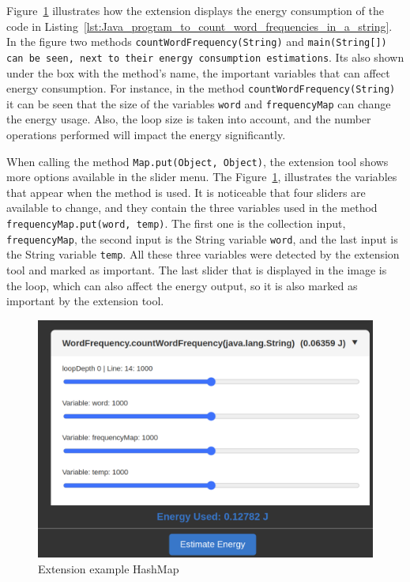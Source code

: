 Figure~\ref{fig:extension_example1} illustrates how the extension displays the energy consumption of the code in Listing~\ref{lst:Java_program_to_count_word_frequencies_in_a_string}. In the figure two methods \texttt{countWordFrequency(String)} and \texttt{main(String[]) can be seen, next to their energy consumption estimations}. Its also shown under the box with the method's name, the important variables that can affect energy consumption. For instance, in the method \texttt{countWordFrequency(String)} it can be seen that the size of the variables \texttt{word} and \texttt{frequencyMap} can change the energy usage. Also, the loop size is taken into account, and the number operations performed will impact the energy significantly.

{\color{blue}When calling the method \texttt{Map.put(Object, Object)}, the extension tool shows more options available in the slider menu. The Figure~\ref{fig:extension_example1}, illustrates the variables that appear when the method is used. It is noticeable that four sliders are available to change, and they contain the three variables used in the method \texttt{frequencyMap.put(word, temp)}. The first one is the collection input, \texttt{frequencyMap}, the second input is the String variable \texttt{word}, and the last input is the String variable \texttt{temp}. All these three variables were detected by the extension tool and marked as important. The last slider that is displayed in the image is the loop, which can also affect the energy output, so it is also marked as important by the extension tool.}



\begin{figure}[htbp]
  \centering
  \includegraphics[width = .8 \textwidth]{figures/extension_example1.png}
  \caption{Extension example HashMap}
  \label{fig:extension_example1}
\end{figure}


